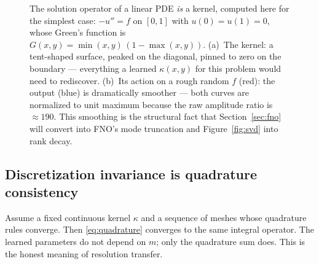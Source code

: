 \documentclass[10pt,a4paper]{article}
\newcommand{\dd}{\mathrm{d}}
\begin{document}
\begin{figure}[t]
\centering
{}\hfill
{}
\caption{The solution operator of a linear PDE \emph{is} a kernel, computed
here for the simplest case: $-u'' = f$ on $[0,1]$ with $u(0) = u(1) = 0$,
whose Green's function is $G(x,y) = \min(x,y)\,(1 - \max(x,y))$.
(a)~The kernel: a tent-shaped surface, peaked on the diagonal, pinned to
zero on the boundary --- everything a learned $\kappa(x,y)$ for this
problem would need to rediscover. (b)~Its action on a rough random
$f$ (red): the output (blue) is dramatically smoother --- both curves are
normalized to unit maximum because the raw amplitude ratio is
$\approx 190$. This smoothing is the structural fact that
Section~\ref{sec:fno} will convert into FNO's mode truncation and
Figure~\ref{fig:svd} into rank decay.}
\label{fig:green}
\end{figure}

\subsection{Discretization invariance is quadrature consistency}

Assume a fixed continuous kernel $\kappa$ and a sequence of meshes whose
quadrature rules converge. Then \eqref{eq:quadrature} converges to the same
integral operator. The learned parameters do not depend on $m$; only the
quadrature sum does. This is the honest meaning of resolution transfer.
\end{document}
